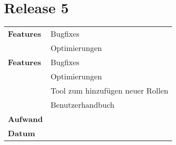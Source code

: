 \section*{Release 5}
\label{sec:release_5}

\begin{tabular}{p{5cm} p{9cm}}
    \textbf{Features} &  Bugfixes \\
    & Optimierungen \\
    \hline
    \textbf{Features} &  Bugfixes \\
    & Optimierungen \\
    & Tool zum hinzufügen neuer Rollen \\
    & Benutzerhandbuch \\
    \hline
    \textbf{Aufwand} & \\
    \hline
    \textbf{Datum} & 
\end{tabular}